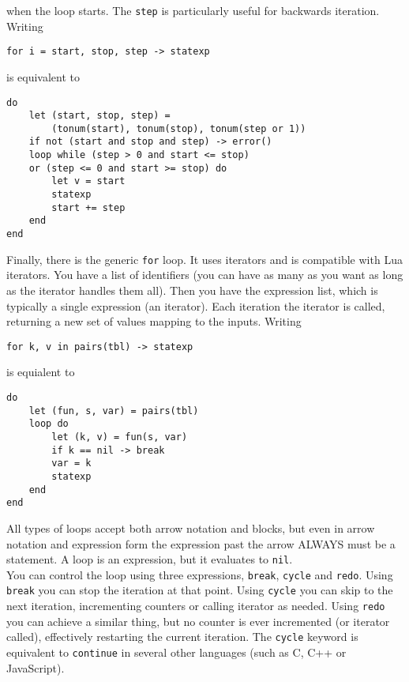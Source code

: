 \documentclass{article}
\begin{document}
when the loop starts. The \verb|step| is particularly useful for backwards
iteration. Writing
\begin{lstlisting}[language=vortex]
for i = start, stop, step -> statexp
\end{lstlisting}
is equivalent to
\begin{lstlisting}[language=vortex]
do
    let (start, stop, step) =
        (tonum(start), tonum(stop), tonum(step or 1))
    if not (start and stop and step) -> error()
    loop while (step > 0 and start <= stop)
    or (step <= 0 and start >= stop) do
        let v = start
        statexp
        start += step
    end
end
\end{lstlisting}
Finally, there is the generic \verb|for| loop. It uses iterators and is
compatible with Lua iterators. You have a list of identifiers (you can have
as many as you want as long as the iterator handles them all). Then you have
the expression list, which is typically a single expression (an iterator).
Each iteration the iterator is called, returning a new set of values mapping
to the inputs. Writing
\begin{lstlisting}[language=vortex]
for k, v in pairs(tbl) -> statexp
\end{lstlisting}
is equialent to
\begin{lstlisting}[language=vortex]
do
    let (fun, s, var) = pairs(tbl)
    loop do
        let (k, v) = fun(s, var)
        if k == nil -> break
        var = k
        statexp
    end
end
\end{lstlisting}
All types of loops accept both arrow notation and blocks, but even in arrow
notation and expression form the expression past the arrow ALWAYS must be
a statement. A loop is an expression, but it evaluates to \verb|nil|.\\
You can control the loop using three expressions, \verb|break|, \verb|cycle|
and \verb|redo|. Using \verb|break| you can stop the iteration at that point.
Using \verb|cycle| you can skip to the next iteration, incrementing counters
or calling iterator as needed. Using \verb|redo| you can achieve a similar
thing, but no counter is ever incremented (or iterator called), effectively
restarting the current iteration. The \verb|cycle| keyword is equivalent to
\verb|continue| in several other languages (such as C, C++ or JavaScript).
\end{document}
